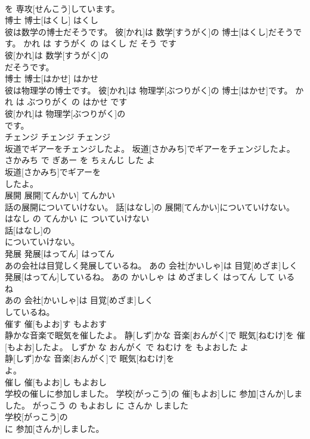 \documentclass[8pt]{extreport}
\begin{document}
\begin{CJK}{UTF8}{min}
\\	を 専攻[せんこう]しています。			
\\	博士	博士[はくし]	はくし	
\\	彼は数学の博士だそうです。	彼[かれ]は 数学[すうがく]の 博士[はくし]だそうです。	かれ は すうがく の はくし だ そう です	
\\	彼[かれ]は 数学[すうがく]の
\\	だそうです。			
\\	博士	博士[はかせ]	はかせ	
\\	彼は物理学の博士です。	彼[かれ]は 物理学[ぶつりがく]の 博士[はかせ]です。	かれ は ぶつりがく の はかせ です	
\\	彼[かれ]は 物理学[ぶつりがく]の
\\	です。			
\\	チェンジ	チェンジ	チェンジ	
\\	坂道でギアーをチェンジしたよ。	坂道[さかみち]でギアーをチェンジしたよ。	さかみち で ぎあー を ちぇんじ した よ	
\\	坂道[さかみち]でギアーを
\\	したよ。			
\\	展開	展開[てんかい]	てんかい	
\\	話の展開についていけない。	話[はなし]の 展開[てんかい]についていけない。	はなし の てんかい に ついていけない	
\\	話[はなし]の
\\	についていけない。			
\\	発展	発展[はってん]	はってん	
\\	あの会社は目覚しく発展しているね。	あの 会社[かいしゃ]は 目覚[めざま]しく 発展[はってん]しているね。	あの かいしゃ は めざましく はってん して いる ね	
\\	あの 会社[かいしゃ]は 目覚[めざま]しく
\\	しているね。			
\\	催す	催[もよお]す	もよおす	
\\	静かな音楽で眠気を催したよ。	静[しず]かな 音楽[おんがく]で 眠気[ねむけ]を 催[もよお]したよ。	しずか な おんがく で ねむけ を もよおした よ	
\\	静[しず]かな 音楽[おんがく]で 眠気[ねむけ]を
\\	よ。			
\\	催し	催[もよお]し	もよおし	
\\	学校の催しに参加しました。	学校[がっこう]の 催[もよお]しに 参加[さんか]しました。	がっこう の もよおし に さんか しました	
\\	学校[がっこう]の
\\	に 参加[さんか]しました。			

\end{CJK}
\end{document}
